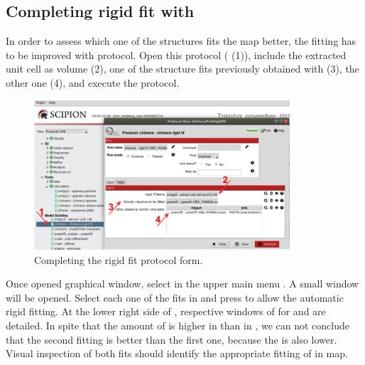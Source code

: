  \subsection*{ Completing rigid fit with \chimera {}}
 
 In order to assess which one of the structures fits the map better, the fitting has to be improved with  protocol. Open this protocol ( (1)), include the extracted unit cell as volume (2), one of the structure fits previously obtained with \powerfit (3), the other one (4), and execute the protocol.
 
 \begin{figure}[H]
  \centering 
  \captionsetup{width=.7\linewidth} 
  \includegraphics[width=0.85\textwidth]{Images/Fig21}
  \caption{Completing the \chimera rigid fit protocol form.}
  \label{fig:chimera_rigid_fit}
  \end{figure}
  
  Once opened \chimera graphical window, select in the upper main menu . A small window will be opened. Select each one of the fits in  and press  to allow the automatic rigid fitting. At the lower right side of , respective windows of  for  and  are detailed. In spite that the amount of  is higher in  than in , we can not conclude that the second fitting is better than the first one, because the  is also lower. Visual inspection of both fits should identify the appropriate fitting of  in map.
  
